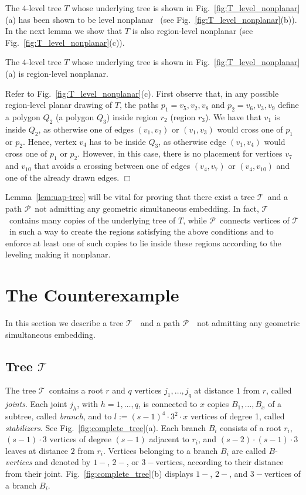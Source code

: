 \documentclass[a4paper,10pt]{llncs}
\renewenvironment{proof}
{{\bf Proof:}}{\hspace*{\fill}$\Box$\par\vspace{2mm}}
\newcommand{\T}{\mbox{$\mathcal T$ }}
\renewcommand{\P}{\mbox{$\mathcal P$ }}
\newcommand{\remove}[1]{}
\begin{document}
The $4$-level tree $T$ whose underlying tree is shown in
Fig.~\ref{fig:T_level_nonplanar}(a) has been shown to be level
nonplanar~\cite{fk-mlnpt-07} (see
Fig.~\ref{fig:T_level_nonplanar}(b)). In the next lemma we show that $T$ is also region-level nonplanar (see Fig.~\ref{fig:T_level_nonplanar}(c)).

\begin{lemma}\label{lem:uap-tree}
The $4$-level tree $T$ whose underlying tree is shown in Fig.~\ref{fig:T_level_nonplanar}(a) is region-level nonplanar.
\end{lemma}

\begin{proof}
Refer to Fig.~\ref{fig:T_level_nonplanar}(c). First observe that, in any possible region-level planar drawing of $T$, the paths $p_1=v_5,v_2,v_8$ and $p_2=v_6,v_3,v_9$ define a polygon $Q_2$ (a polygon $Q_3$) inside region $r_2$ (region $r_3$). We have that $v_1$ is inside $Q_2$, as otherwise one of edges $(v_1,v_2)$ or $(v_1,v_3)$ would cross one of $p_1$ or $p_2$. Hence, vertex $v_4$ has to be inside $Q_3$, as otherwise edge $(v_1,v_4)$ would cross one of $p_1$ or $p_2$. However, in this case, there is no placement for vertices $v_7$ and $v_{10}$ that avoids a crossing between one of edges $(v_4,v_7)$ or $(v_4,v_{10})$ and one of the already drawn edges.
\end{proof}

Lemma~\ref{lem:uap-tree} will be vital for proving that there exist a tree \T and a path \P not admitting any geometric simultaneous embedding. In fact, \T contains many copies of the underlying tree of $T$, while \P connects vertices of \T in such a way to create the regions satisfying the above conditions and to enforce at least one of such copies to lie inside these regions according to the leveling making it nonplanar.

\section{The Counterexample}\label{se:tree-path}

In this section we describe a tree $\T$ and a path $\P$ not admitting any geometric simultaneous embedding.

\subsection{Tree \T}
The tree \T contains a root $r$ and $q$ \remove{:= {535\choose 7}} vertices $j_1, \ldots, j_q$ at distance $1$ from $r$, called {\it joints}. Each joint $j_h$, with $h=1,\dots,q$, is connected to $x$ copies $B_1,\ldots,B_x$ of a subtree, called {\it branch}, and to $l:=(s-1)^4 \cdot 3^2 \cdot x$ vertices of degree 1, called {\it stabilizers}. See Fig.~\ref{fig:complete_tree}(a).
Each branch $B_i$ consists of a root $r_i$, $(s-1)\cdot 3$ vertices of degree $(s-1)$ adjacent to $r_i$, and $(s-2) \cdot (s-1)\cdot 3$ leaves at distance $2$ from $r_i$. Vertices belonging to a branch $B_i$ are called $B$-\emph{vertices} and denoted by $1-$, $2-$, or $3-$vertices, according to their distance from their joint. Fig.~\ref{fig:complete_tree}(b) displays $1-$, $2-$, and $3-$vertices of a branch $B_i$.
\end{document}
